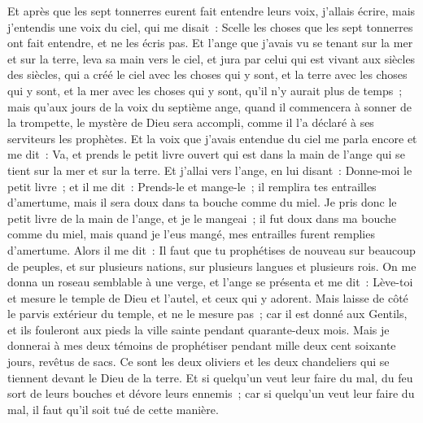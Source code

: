 \begin{multicols}{2}
Et après que les sept tonnerres eurent fait entendre leurs voix, j'allais écrire, mais j'entendis une voix du ciel, qui me disait~: Scelle les choses que les sept tonnerres ont fait entendre, et ne les écris pas.
Et l'ange que j'avais vu se tenant sur la mer et sur la terre, leva sa main vers le ciel,
et jura par celui qui est vivant aux siècles des siècles, qui a créé le ciel avec les choses qui y sont, et la terre avec les choses qui y sont, et la mer avec les choses qui y sont, qu'il n'y aurait plus de temps~;
mais qu'aux jours de la voix du septième ange, quand il commencera à sonner de la trompette, le mystère de Dieu sera accompli, comme il l'a déclaré à ses serviteurs les prophètes.
Et la voix que j'avais entendue du ciel me parla encore et me dit~: Va, et prends le petit livre ouvert qui est dans la main de l'ange qui se tient sur la mer et sur la terre.
Et j'allai vers l'ange, en lui disant~: Donne-moi le petit livre~; et il me dit~: Prends-le et mange-le~; il remplira tes entrailles d'amertume, mais il sera doux dans ta bouche comme du miel.
Je pris donc le petit livre de la main de l'ange, et je le mangeai~; il fut doux dans ma bouche comme du miel, mais quand je l'eus mangé, mes entrailles furent remplies d'amertume.
Alors il me dit~: Il faut que tu prophétises de nouveau sur beaucoup de peuples, et sur plusieurs nations, sur plusieurs langues et plusieurs rois.
\VerseOne{}On me donna un roseau semblable à une verge, et l'ange se présenta et me dit~: Lève-toi et mesure le temple de Dieu et l'autel, et ceux qui y adorent.
Mais laisse de côté le parvis extérieur du temple, et ne le mesure pas~; car il est donné aux Gentils, et ils fouleront aux pieds la ville sainte pendant quarante-deux mois.
Mais je donnerai à mes deux témoins de prophétiser pendant mille deux cent soixante jours, revêtus de sacs.
Ce sont les deux oliviers et les deux chandeliers qui se tiennent devant le Dieu de la terre.
Et si quelqu'un veut leur faire du mal, du feu sort de leurs bouches et dévore leurs ennemis~; car si quelqu'un veut leur faire du mal, il faut qu'il soit tué de cette manière.

\end{multicols}
